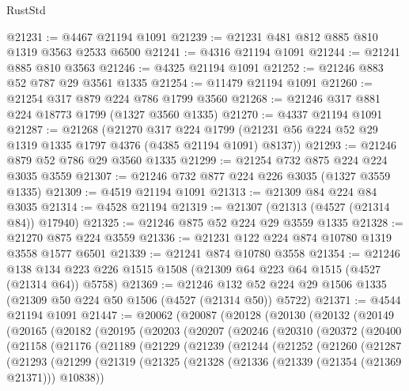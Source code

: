 \begin{lexlean}{RustStd}
\begin{coremodule}
{\begin{coremodule}
{{{{{{{{{{{{{{{{{{{{{{{{{{{{{{{{{{{{{{@21231 := @4467 @21194 @1091
@21239 := @21231 @481 @812 @885 @810 @1319 @3563 @2533 @6500
@21241 := @4316 @21194 @1091
@21244 := @21241 @885 @810 @3563
@21246 := @4325 @21194 @1091
@21252 := @21246 @883 @52 @787 @29 @3561 @1335
@21254 := @11479 @21194 @1091
@21260 := @21254 @317 @879 @224 @786 @1799 @3560
@21268 := @21246 @317 @881 @224 @18773 @1799 (@1327 @3560 @1335)
@21270 := @4337 @21194 @1091
@21287 := @21268
    (@21270
      @317
      @224
      @1799
      (@21231 @56 @224 @52 @29 @1319 @1335 @1797 @4376 (@4385 @21194 @1091) @8137))
@21293 := @21246 @879 @52 @786 @29 @3560 @1335
@21299 := @21254 @732 @875 @224 @224 @3035 @3559
@21307 := @21246 @732 @877 @224 @226 @3035 (@1327 @3559 @1335)
@21309 := @4519 @21194 @1091
@21313 := @21309 @84 @224 @84 @3035
@21314 := @4528 @21194
@21319 := @21307 (@21313 (@4527 (@21314 @84)) @17940)
@21325 := @21246 @875 @52 @224 @29 @3559 @1335
@21328 := @21270 @875 @224 @3559
@21336 := @21231 @122 @224 @874 @10780 @1319 @3558 @1577 @6501
@21339 := @21241 @874 @10780 @3558
@21354 := @21246
    @138
    @134
    @223
    @226
    @1515
    @1508
    (@21309 @64 @223 @64 @1515 (@4527 (@21314 @64)) @5758)
@21369 := @21246
    @132
    @52
    @224
    @29
    @1506
    @1335
    (@21309 @50 @224 @50 @1506 (@4527 (@21314 @50)) @5722)
@21371 := @4544 @21194 @1091
@21447 := @20062
    (@20087
      (@20128
        (@20130
          (@20132
            (@20149
              (@20165
                (@20182
                  (@20195
                    (@20203
                      (@20207
                        (@20246
                          (@20310
                            (@20372
                              (@20400
                                (@21158
                                  (@21176
                                    (@21189
                                      (@21229
                                        (@21239
                                          (@21244
                                            (@21252
                                              (@21260
                                                (@21287
                                                  (@21293
                                                    (@21299
                                                      (@21319
                                                        (@21325
                                                          (@21328
                                                            (@21336
                                                              (@21339 (@21354 (@21369 @21371)))
                                                              @10838))
}}}}}}}}}}}}}}}}}}}}}}}}}}}}}}}}}}}}}}
\end{coremodule}}
\end{coremodule}
\end{lexlean}
